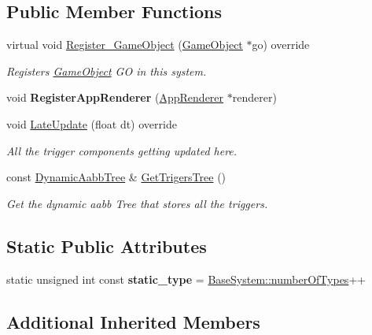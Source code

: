 \subsection*{Public Member Functions}
\begin{DoxyCompactItemize}
\item 
virtual void \hyperlink{classTriggerSystem_a325a3dac44863b2e07868aeb9ae97d97}{Register\+\_\+\+Game\+Object} (\hyperlink{classGameObject}{Game\+Object} $\ast$go) override
\begin{DoxyCompactList}\small\item\em Registers \hyperlink{classGameObject}{Game\+Object} GO in this system. \end{DoxyCompactList}\item 
\mbox{\label{classTriggerSystem_af5b00b1d353b5008c9d8480910926b9c}} 
void {\bfseries Register\+App\+Renderer} (\hyperlink{classAppRenderer}{App\+Renderer} $\ast$renderer)
\item 
void \hyperlink{classTriggerSystem_a804c490350677fea99a385b1f22a85b6}{Late\+Update} (float dt) override
\begin{DoxyCompactList}\small\item\em All the trigger components getting updated here. \end{DoxyCompactList}\item 
const \hyperlink{classDynamicAabbTree}{Dynamic\+Aabb\+Tree} \& \hyperlink{classTriggerSystem_a1f187d6138a8048080ba96e98044cef8}{Get\+Trigers\+Tree} ()
\begin{DoxyCompactList}\small\item\em Get the dynamic aabb Tree that stores all the triggers. \end{DoxyCompactList}\end{DoxyCompactItemize}
\subsection*{Static Public Attributes}
\begin{DoxyCompactItemize}
\item 
\mbox{\label{classTriggerSystem_a225bcf6138182bd49f00db6b497b61f2}} 
static unsigned int const {\bfseries static\+\_\+type} = \hyperlink{classBaseSystem_a7ef356edab3cfb02905e0a73a645b131}{Base\+System\+::number\+Of\+Types}++
\end{DoxyCompactItemize}
\subsection*{Additional Inherited Members}


